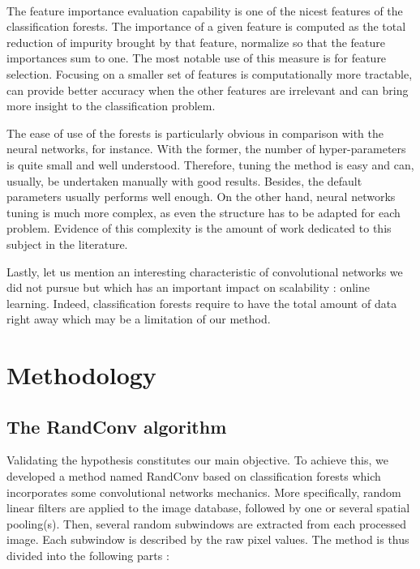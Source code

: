 \documentclass[a4paper]{report}
\begin{document}
\paragraph{}
The feature importance evaluation capability is one of the nicest features of the classification forests. The importance of a given feature is computed as the total reduction of impurity brought by that feature, normalize so that the feature importances sum to one. The most notable use of this measure is for feature selection. Focusing on a smaller set of features is computationally more tractable, can provide better accuracy when the other features are irrelevant and can bring more insight to the classification problem.
\par
The ease of use of the forests is particularly obvious in comparison with the neural networks, for instance. With the former, the number of hyper-parameters is quite small and well understood. Therefore, tuning the method is easy and can, usually, be undertaken manually with good results. Besides, the default parameters usually performs well enough. On the other hand, neural networks tuning is much more complex, as even the structure has to be adapted for each problem. Evidence of this complexity is the amount of work dedicated to this subject in the literature. %
\par
Lastly, let us mention an interesting characteristic of convolutional networks we did not pursue but which has an important impact on scalability : online learning. Indeed, classification forests require to have the total amount of data right away which may be a limitation of our method.


\section{Methodology}
\subsection{The RandConv algorithm}
Validating the hypothesis constitutes our main objective. To achieve this, we developed a method named RandConv based on classification forests which incorporates some convolutional networks mechanics. More specifically, random linear filters are applied to the image database, followed by one or several spatial pooling(s). Then, several random subwindows are extracted from each processed image. Each subwindow is described by the raw pixel values. The method is thus divided into the following parts :
	
\end{document}
